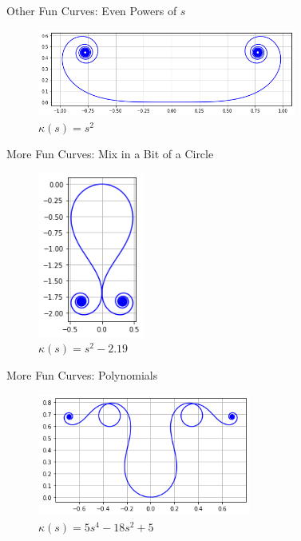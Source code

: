 \documentclass{beamer}
\begin{document}
\begin{frame}{Other Fun Curves: Even Powers of $s$}
	\begin{figure}
		\caption{$\kappa(s) = s^2$}
		\centering
		\includegraphics[width=85mm, scale=0.5]{chaise_longue.png}
	\end{figure}
\end{frame}

\begin{frame}{More Fun Curves: Mix in a Bit of a Circle}
	\begin{figure}
		\caption{$\kappa(s) = s ^ 2 -2.19$}
		\centering
		\includegraphics[width=35mm, scale=0.2]{s_squared_minus_219.png}
	\end{figure}
\end{frame}

\begin{frame}{More Fun Curves: Polynomials}
	\begin{figure}
		\caption{$\kappa(s) = 5 s ^ 4 - 18 s ^ 2 + 5$}
		\centering
		\includegraphics[width=70mm, scale=0.5]{five_s^4.png}
	\end{figure}
\end{frame}
\end{document}
